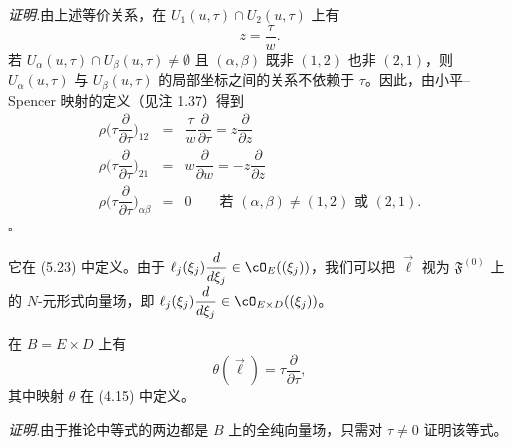 \noindent\textit{证明.}\quad 由上述等价关系，在 $U_1(u,\tau)\cap U_2(u,\tau)$ 上有
\[
z=\frac{\tau}{w}.
\]
若 $U_\alpha(u,\tau)\cap U_\beta(u,\tau)\ne\emptyset$ 且 $(\alpha,\beta)$ 既非 $(1,2)$ 也非 $(2,1)$，则 $U_\alpha(u,\tau)$ 与 $U_\beta(u,\tau)$ 的局部坐标之间的关系不依赖于 $\tau$。因此，由小平–Spencer 映射的定义（见注 1.37）得到
\[
\begin{array}{rcl}
\rho\bigl(\tau\dfrac{\partial}{\partial\tau}\bigr)_{12} & = & \dfrac{\tau}{w}\dfrac{\partial}{\partial\tau}
   = z\dfrac{\partial}{\partial z}\\[10pt]
\rho\bigl(\tau\dfrac{\partial}{\partial\tau}\bigr)_{21} & = & w\dfrac{\partial}{\partial w}
   = -z\dfrac{\partial}{\partial z}\\[10pt]
\rho\bigl(\tau\dfrac{\partial}{\partial\tau}\bigr)_{\alpha\beta} & = & 0\qquad
   \text{若 } (\alpha,\beta)\ne(1,2)\text{ 或 }(2,1).
\end{array}
\]
\hfill$\square$


它在 (5.23) 中定义。由于 $\ell_j(\xi_j)\dfrac{d}{d\xi_j}\in\cO_E((\xi_j))$，我们可以把 $\vec\ell$ 视为 $\mathfrak{F}^{(0)}$ 上的 $N$-元形式向量场，即 $\ell_j(\xi_j)\dfrac{d}{d\xi_j}\in\cO_{E\times D}((\xi_j))$。

\begin{corollary}[5.17]
在 $B=E\times D$ 上有
\[
\theta(\vec\ell)=\tau\frac{\partial}{\partial\tau},
\]
其中映射 $\theta$ 在 (4.15) 中定义。
\end{corollary}

\noindent\textit{证明.}\quad 由于推论中等式的两边都是 $B$ 上的全纯向量场，只需对 $\tau\ne0$ 证明该等式。


